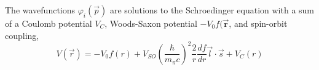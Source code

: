 The wavefunctions $\varphi_i(\vec{p})$ are solutions to the Schroedinger
equation with a sum of
a Coulomb potential $V_C$,
Woods-Saxon potential $-V_0 f(\mathbf{\vec{r}}$,
and spin-orbit coupling,
\begin{equation}
    V(\vec{r}) = -V_{0} f(r)
                 + V_{SO} \left(\frac{\hbar}{m_\pi c}\right)^{2}
                          \frac{2}{r} \frac{df}{dr}
                          \vec{l}\cdot\vec{s}
                 + V_{C}(r)
\end{equation}




